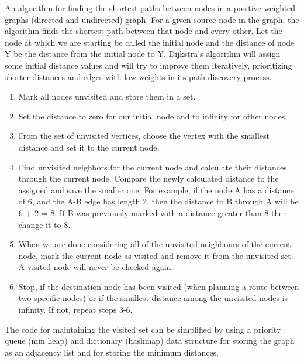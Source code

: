 \documentclass{article}
\begin{document}
    An algorithm for finding the shortest paths between nodes in a positive weighted graphs (directed and undirected) graph. For a given source node in the graph, the algorithm finds the shortest path between that node and every other. Let the node at which we are starting be called the initial node and the distance of node Y be the distance from the initial node to Y. Dijkstra's algorithm will assign some initial distance values and will try to improve them iteratively, prioritizing shorter distances and edges with low weights in its path discovery process.
    
    
    \begin{enumerate}
        \item Mark all nodes unvisited and store them in a set.
        
        \item Set the distance to zero for our initial node and to infinity for other nodes.

        \item From the set of unvisited vertices, choose the vertex with the smallest distance and set it to the current node.
        
        \item Find unvisited neighbors for the current node and calculate their distances through the current node. Compare the newly calculated distance to the assigned and save the smaller one. 
        For example, if the node A has a distance of 6, and the A-B edge has length 2, then the distance to B through A will be 6 + 2 = 8. If B was previously marked with a distance greater than 8 then change it to 8.

        \item When we are done considering all of the unvisited neighbours of the current node, mark the current node as visited and remove it from the unvisited set. A visited node will never be checked again.
        
        \item Stop, if the destination node has been visited (when planning a route between two specific nodes) or if the smallest distance among the unvisited nodes is infinity. If not, repeat steps 3-6.
    \end{enumerate}
    
    The code for maintaining the visited set can be simplified by using a priority queue (min heap) and dictionary (hashmap) data structure for storing the graph as an adjacency list and for storing the minimum distances.
    
\end{document}
